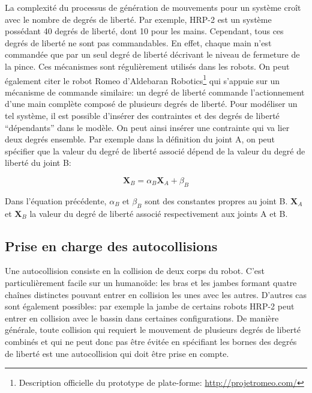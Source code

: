 La complexité du processus de génération de mouvements pour un système
croît avec le nombre de degrés de liberté. Par exemple,
HRP-2 est un système possédant 40 degrés de
liberté, dont 10 pour les mains. Cependant,
tous ces degrés de liberté ne sont pas commandables. En effet, chaque
main n'est commandée que par un seul degré de liberté décrivant le
niveau de fermeture de la pince. Ces mécanismes sont régulièrement
utilisés dans les robots. On peut également citer le robot Romeo
d'Aldebaran Robotics\footnote{Description officielle du prototype de
  plate-forme: \url{http://projetromeo.com/}} qui s'appuie sur un
mécanisme de commande similaire: un degré de liberté commande
l'actionnement d'une main complète composé de plusieurs degrés de
liberté. Pour modéliser un tel système, il est possible d'insérer des
contraintes et des degrés de liberté ``dépendants'' dans le modèle. On
peut ainsi insérer une contrainte qui va lier deux degrés
ensemble. Par exemple dans la définition du joint A, on peut spécifier
que la valeur du degré de liberté associé dépend de la valeur du degré
de liberté du joint B:

\begin{equation}
  \mathbf{X}_B = \alpha_B \mathbf{X}_A + \beta_B
\end{equation}

Dans l'équation précédente, $\alpha_B$ et $\beta_B$ sont des
constantes propres au joint B. $\mathbf{X}_A$ et $\mathbf{X}_B$ la
valeur du degré de liberté associé respectivement aux joints A et B.


\subsection{Prise en charge des autocollisions}

Une autocollision consiste en la collision de deux corps du
robot. C'est particulièrement facile sur un humanoïde: les bras et les
jambes formant quatre chaînes distinctes pouvant entrer en collision
les unes avec les autres. D'autres cas sont également possibles: par
exemple la jambe de certains robots HRP-2 peut entrer en collision
avec le bassin dans certaines configurations. De manière générale,
toute collision qui requiert le mouvement de plusieurs degrés de
liberté combinés et qui ne peut donc pas être évitée en spécifiant les
bornes des degrés de liberté est une autocollision qui doit être prise
en compte.

